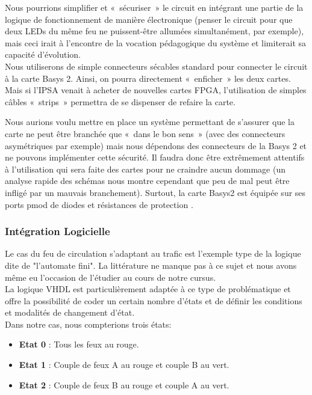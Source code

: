 			Nous pourrions simplifier et « sécuriser » le circuit en intégrant une partie de la logique de fonctionnement de manière électronique (penser le circuit pour que deux LEDs du même feu ne puissent-être allumées simultanément, par exemple), mais ceci irait à l’encontre de la vocation pédagogique du système et limiterait sa capacité d’évolution.\\

			Nous utiliserons de simple connecteurs sécables standard pour connecter le circuit à la carte Basys 2. Ainsi, on pourra directement « enficher » les deux cartes. Mais si l’IPSA venait à acheter de nouvelles cartes FPGA, l’utilisation de simples câbles « strips » permettra de se dispenser de refaire la carte.\\


			Nous aurions voulu mettre en place un système permettant de s’assurer que la carte ne peut être branchée que « dans le bon sens » (avec des connecteurs asymétriques par exemple) mais nous dépendons des connecteurs de la Basys 2 et ne pouvons implémenter cette sécurité. Il faudra donc être extrêmement attentifs à l’utilisation qui sera faite des cartes pour ne craindre aucun dommage (un analyse rapide des schémas nous montre cependant que peu de mal peut être infligé par un mauvais branchement). Surtout, la carte Basys2 est équipée sur ses ports pmod de diodes et résistances de protection \cite{bib23}.

	\subsubsection{Intégration Logicielle}

		Le cas du feu de circulation s'adaptant au trafic est l'exemple type de la logique dite de "l'automate fini". La littérature ne manque pas à ce sujet et nous avons même eu l'occasion de l'étudier au cours de notre cursus.\\

		La logique VHDL  est particulièrement adaptée à ce type de problématique et offre la possibilité de coder un certain nombre d'états et de définir les conditions et modalités de changement d'état.\\

		Dans notre cas, nous compterions trois états:
		\begin{itemize}
			\item \textbf{Etat 0} : Tous les feux au rouge.
			\item \textbf{Etat 1} : Couple de feux A au rouge et couple B au vert.
			\item \textbf{Etat 2} : Couple de feux B au rouge et couple A au vert.
		\end{itemize}

